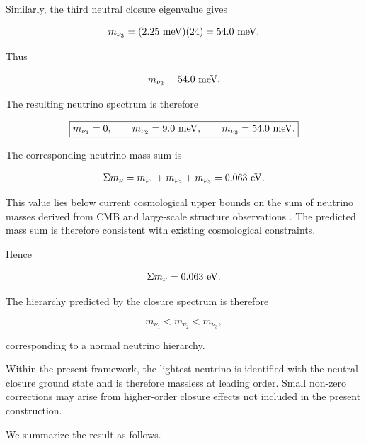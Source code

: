 \documentclass[11pt]{article}
\theoremstyle{definition}
\theoremstyle{remark}
\begin{document}
Similarly, the third neutral closure eigenvalue gives

\begin{equation}
m_{\nu_3} = (2.25~{\rm meV})(24)
=
54.0~{\rm meV}.
\end{equation}

Thus

\begin{equation}
m_{\nu_3} =
54.0~{\rm meV}.
\label{eq:mnu3}
\end{equation}

The resulting neutrino spectrum is therefore

\begin{equation}
\boxed{
m_{\nu_1} =
0,
\qquad
m_{\nu_2} =
9.0~{\rm meV},
\qquad
m_{\nu_3} =
54.0~{\rm meV}.
}
\label{eq:sft_neutrino_spectrum}
\end{equation}

The corresponding neutrino mass sum is

\begin{equation}
\Sigma m_\nu = 
m_{\nu_1}
+
m_{\nu_2}
+
m_{\nu_3} = 
0.063~{\rm eV}.
\end{equation}

This value lies below current cosmological upper bounds on the
sum of neutrino masses derived from CMB and large-scale
structure observations \cite{PDG2024,Planck2018}. The predicted
mass sum is therefore consistent with existing cosmological
constraints.

Hence

\begin{equation}
\Sigma m_\nu = 
0.063~{\rm eV}.
\label{eq:neutrino_mass_sum}
\end{equation}

The hierarchy predicted by the closure spectrum is therefore

\begin{equation}
m_{\nu_1}
<
m_{\nu_2}
<
m_{\nu_3},
\end{equation}

corresponding to a normal neutrino hierarchy.

Within the present framework, the lightest neutrino is identified
with the neutral closure ground state and is therefore massless
at leading order. Small non-zero corrections may arise from
higher-order closure effects not included in the present
construction.

We summarize the result as follows.
\end{document}
